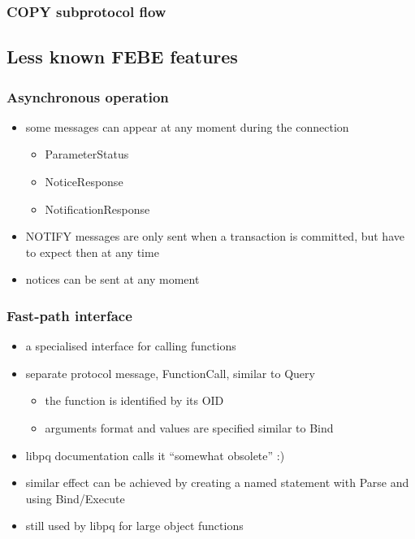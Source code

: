 \documentclass{beamer}
\begin{document}
\begin{frame}
  \frametitle{COPY subprotocol flow}

\end{frame}

\subsection{Less known FEBE features}
\begin{frame}
  \frametitle{Asynchronous operation}

  \begin{itemize}
  \item some messages can appear at any moment during the connection
    \begin{itemize}
    \item ParameterStatus
    \item NoticeResponse
    \item NotificationResponse
    \end{itemize}
  \item NOTIFY messages are only sent when a transaction is committed, but have
    to expect then at any time
  \item notices can be sent at any moment
  \end{itemize}
\end{frame}

\begin{frame}
  \frametitle{Fast-path interface}

  \begin{itemize}
  \item a specialised interface for calling functions
  \item separate protocol message, FunctionCall, similar to Query
    \begin{itemize}
    \item the function is identified by its OID
    \item arguments format and values are specified similar to Bind
    \end{itemize}
  \item libpq documentation calls it ``somewhat obsolete'' :)
  \item similar effect can be achieved by creating a named statement with Parse
    and using Bind/Execute
  \item still used by libpq for large object functions
  \end{itemize}
\end{frame}
\end{document}

